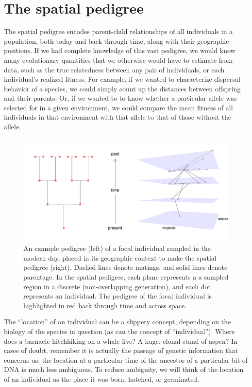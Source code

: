 \documentclass{ar-1col}
\begin{document}
\section{The spatial pedigree}

The spatial pedigree 
encodes parent-child relationships of all individuals in a population,
both today and back through time,
along with their geographic positions.
If we had complete knowledge of this vast pedigree,
we would know many evolutionary quantities
that we otherwise would have to estimate from data,
such as the true relatedness between any pair of individuals,
or each individual's realized fitness.
For example, if we wanted to characterize dispersal behavior of a species,
we could simply count up the distances between offspring and their parents.
Or, if we wanted to to know whether a particular allele
was selected for in a given environment,
we could compare the mean fitness of all individuals in that environment with that allele
to that of those without the allele.

\begin{figure}[h]
    \centering
         \includegraphics[width=\linewidth]{figs/spatial_pedigree.pdf}
        \caption{
		An example pedigree (left) of a focal individual sampled in the modern day, 
	   	placed in its geographic context to make the spatial pedigree (right).
		Dashed lines denote matings, and solid lines denote parentage.
		In the spatial pedigree, 
		each plane represents a a sampled region in a discrete (non-overlapping generation),
		and each dot represents an individual.
		The pedigree of the focal individual is highlighted in red 
		back through time and across space.
        }
        \label{spatial_pedigree}
\end{figure}

The ``location'' of an individual can be a slippery concept,
depending on the biology of the species in question
(as can the concept of ``individual'').
Where does a barnacle hitchhiking on a whale live?
A huge, clonal stand of aspen?
In cases of doubt,
remember it is actually the passage of genetic information that concerns us:
the location at a particular time of the ancestor of a particular bit of DNA
is much less ambiguous.
To reduce ambiguity,
we will think of the location of an individual as the place it was
born, hatched, or germinated.
\end{document}
